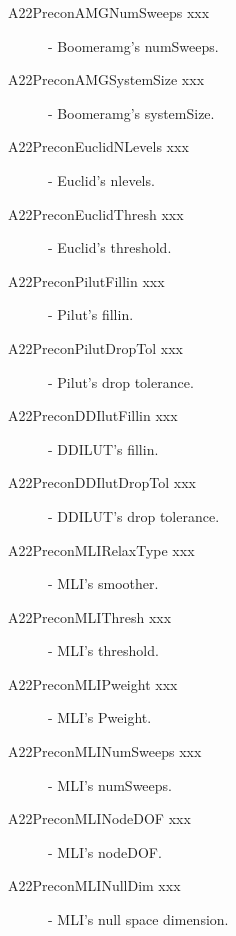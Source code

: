 \begin{description}
\item[A22PreconAMGNumSweeps xxx] - Boomeramg's numSweeps.
\item[A22PreconAMGSystemSize xxx] - Boomeramg's systemSize.
\item[A22PreconEuclidNLevels xxx] - Euclid's nlevels.
\item[A22PreconEuclidThresh xxx] - Euclid's threshold.
\item[A22PreconPilutFillin xxx] - Pilut's fillin.
\item[A22PreconPilutDropTol xxx] - Pilut's drop tolerance.
\item[A22PreconDDIlutFillin xxx] - DDILUT's fillin.
\item[A22PreconDDIlutDropTol xxx] - DDILUT's drop tolerance.
\item[A22PreconMLIRelaxType xxx] - MLI's smoother.
\item[A22PreconMLIThresh xxx] - MLI's threshold.
\item[A22PreconMLIPweight xxx] - MLI's Pweight.
\item[A22PreconMLINumSweeps xxx] - MLI's numSweeps.
\item[A22PreconMLINodeDOF xxx] - MLI's nodeDOF.
\item[A22PreconMLINullDim xxx] - MLI's null space dimension.
\end{description}


